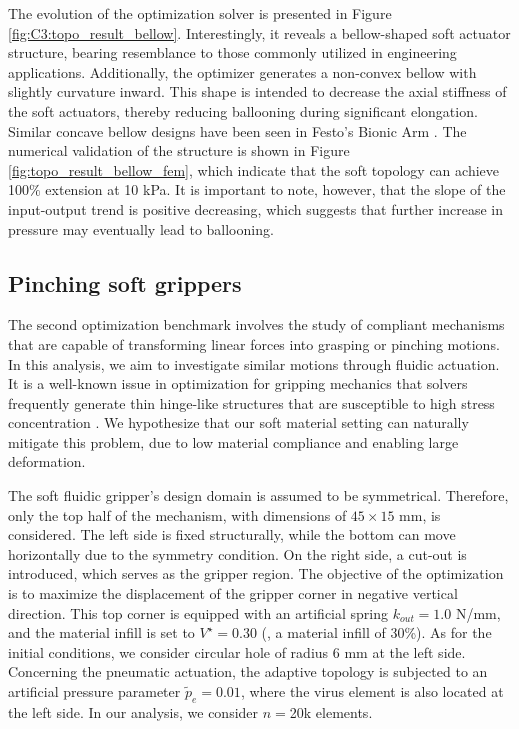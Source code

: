 The evolution of the optimization solver is presented in Figure \ref{fig:C3:topo_result_bellow}. Interestingly, it reveals a bellow-shaped soft actuator structure, bearing resemblance to those commonly utilized in engineering applications. Additionally, the optimizer generates a non-convex bellow with  slightly curvature inward. This shape is intended to decrease the axial stiffness of the soft actuators, thereby reducing ballooning during significant elongation. Similar concave bellow designs have been seen in Festo's Bionic Arm \cite{Hairer2002}. The numerical validation of the structure is shown in Figure \ref{fig:topo_result_bellow_fem}, which indicate that the soft topology can achieve 100$\%$ extension at 10 \si{\kilo \pascal}. It is important to note, however, that the slope of the input-output trend is positive decreasing, which suggests that further increase in pressure may eventually lead to ballooning.

\subsection{Pinching soft grippers}
\label{sec:C3:Gripper_results}
The second optimization benchmark involves the study of compliant mechanisms that are capable of transforming linear forces into grasping or pinching motions. In this analysis, we aim to investigate similar motions through fluidic actuation. It is a well-known issue in optimization for gripping mechanics that solvers frequently generate thin hinge-like structures that are susceptible to high stress concentration \cite{Bendsoe2003,Luo2016Mar}. We hypothesize that our soft material setting can naturally mitigate this problem, due to low material compliance and enabling large deformation.

The soft fluidic gripper's design domain is assumed to be symmetrical. Therefore, only the top half of the mechanism, with dimensions of $45 \times 15$ \si{\milli \meter}, is considered. The left side is fixed structurally, while the bottom can move horizontally due to the symmetry condition. On the right side, a cut-out is introduced, which serves as the gripper region. The objective of the optimization is to maximize the displacement of the gripper corner in negative vertical direction. This top corner is equipped with an artificial spring $k_{out} = 1.0$ N/mm, and the material infill is set to $V^\star = 0.30$ (\ie, a material infill of 30\%). As for the initial conditions, we consider circular hole of radius $6$ \si{\milli \meter} at the left side. Concerning the pneumatic actuation, the adaptive topology is subjected to an artificial pressure parameter $\tilde{p}_e = 0.01$, where the virus element is also located at the left side. In our analysis, we consider $n=$20k elements.

